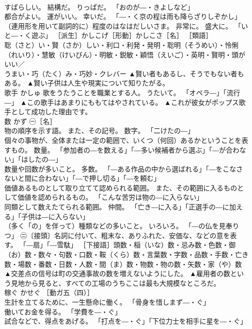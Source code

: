 \documentclass[8pt]{extreport}
\begin{document}
\begin{CJK}{UTF8}{min}
\\	すばらしい。 結構だ。 りっぱだ。 「おのが―・きよしなど」 
\\	都合がよい。 運がいい。 幸いだ。 「―・く京の程は雨も降らざりしぞかし」 
\\	（連用形を用いて副詞的に）程度のはなはだしいさま。 非常に。 盛大に。 「いと―・く遊ぶ」 ［派生］かしこげ［形動］かしこさ［名］ ［類語］
\\	聡（さと）い・賢（さか）しい・利口・利発・発明・聡明（そうめい）・怜悧（れいり）・慧敏（けいびん）・明敏・鋭敏・穎悟（えいご）・英明・賢明・頭がいい／
\\	うまい・巧（たく）み・巧妙・クレバー	▲賢い者もあるし、そうでもない者もある。 ▲賢い子供は人生や現実について知りたがる。
\\	歌手	かしゅ	歌をうたうことを職業とする人。 うたいて。 「オペラ―」「流行―」	▲この歌手はあまりにももてはやされている。 ▲これが彼女がポップス歌手として成功した理由です。
\\	数	かず	㊀［名］ 
\\	物の順序を示す語。 また、その記号。 数字。 「二けたの―」 
\\	個々の事物が、全体または一定の範囲で、いくつ（何回）あるかということを表すもの。 数量。 「参加者の―を数える」「―多い候補者から選ぶ」「―が合わない」「はしたの―」 
\\	数量や回数が多いこと。 多数。 「―ある作品の中から選ばれる」「―をこなさないと間に合わない」「―で押し切る」「―を頼む」 
\\	価値あるものとして取り立てて認められる範囲。 また、その範囲に入るものとして価値を認められるもの。 「こんな苦労は物の―に入らない」 
\\	同類として数えたてられる範囲。 仲間。 「亡き―に入る」「正選手の―に加える」「子供は―に入らない」 
\\	（多く「の」を伴って）種類などの多いこと。 いろいろ。 「―の仏を見奉りつ」 ㊁〔接頭〕名詞に付いて、粗末な、ありふれた、安価な、などの意を表す。 「―扇」「―雪駄」 ［下接語］頭数・稲（いな）数・忌み数・色数・御（お）数・数々・句数・口数・鞍（くら）数・言葉数・字数・品数・手数・亡き数・場数・番数・日数・人数・間（ま）数・物数・物の数・矢数・家（や）数	▲交差点の信号は町の交通事故の数を増えないようにした。 ▲雇用者の数という見地から見ると、すべての工場のうちここは最も大規模なところだ。
\\	稼ぐ	かせぐ	［動ガ五（四）］ 
\\	生計を立てるために、一生懸命に働く。 「骨身を惜しまず―・ぐ」 
\\	働いてお金を得る。 「学費を―・ぐ」 
\\	試合などで、得点をあげる。 「打点を―・ぐ」「下位力士を相手に星を―・ぐ」 

\end{CJK}
\end{document}
